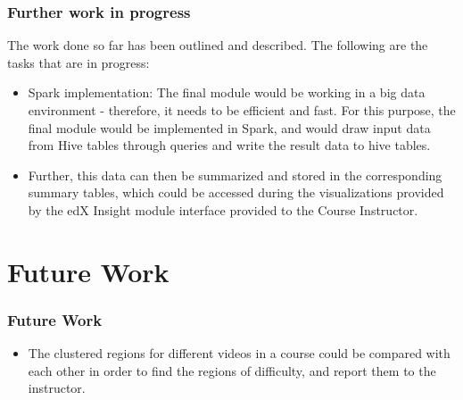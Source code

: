 \documentclass[12pt,xcolor=dvipsnames]{beamer}
\begin{document}
\begin{frame}[t]
\frametitle{Further work in progress}

The work done so far has been outlined and described. The following are the tasks that are in progress:

\begin{itemize}
\item Spark implementation: The final module would be working in a big data environment - therefore, it needs to be efficient and fast. For this purpose, the final module would be implemented in Spark, and would draw input data from Hive tables through queries and write the result data to hive tables.

\item Further, this data can then be summarized and stored in the corresponding summary tables, which could be accessed during the visualizations provided by the edX Insight module interface provided to the Course Instructor.

\end{itemize}

\end{frame}

\section{Future Work}

\begin{frame}[t]
\frametitle{Future Work}

\begin{itemize}

\vspace{70pt}

\item The clustered regions for different videos in a course could be compared with each other in order to find the regions of difficulty, and report them to the instructor.
\end{itemize}

\end{frame}

\end{document}
